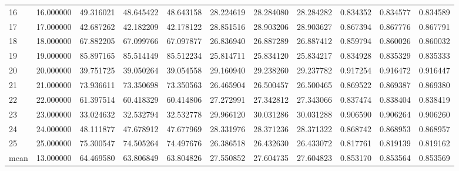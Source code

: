 \begin{tabular}{lrrrrrrrrrr}
16 & 16.000000 & 49.316021 & 48.645422 & 48.643158 & 28.224619 & 28.284080 & 28.284282 & 0.834352 & 0.834577 & 0.834589 \\
17 & 17.000000 & 42.687262 & 42.182209 & 42.178122 & 28.851516 & 28.903206 & 28.903627 & 0.867394 & 0.867776 & 0.867791 \\
18 & 18.000000 & 67.882205 & 67.099766 & 67.097877 & 26.836940 & 26.887289 & 26.887412 & 0.859794 & 0.860026 & 0.860032 \\
19 & 19.000000 & 85.897165 & 85.514149 & 85.512234 & 25.814711 & 25.834120 & 25.834217 & 0.834928 & 0.835329 & 0.835333 \\
20 & 20.000000 & 39.751725 & 39.050264 & 39.054558 & 29.160940 & 29.238260 & 29.237782 & 0.917254 & 0.916472 & 0.916447 \\
21 & 21.000000 & 73.936611 & 73.350698 & 73.350563 & 26.465904 & 26.500457 & 26.500465 & 0.869522 & 0.869387 & 0.869380 \\
22 & 22.000000 & 61.397514 & 60.418329 & 60.414806 & 27.272991 & 27.342812 & 27.343066 & 0.837474 & 0.838404 & 0.838419 \\
23 & 23.000000 & 33.024632 & 32.532794 & 32.532778 & 29.966120 & 30.031286 & 30.031288 & 0.906590 & 0.906264 & 0.906260 \\
24 & 24.000000 & 48.111877 & 47.678912 & 47.677969 & 28.331976 & 28.371236 & 28.371322 & 0.868742 & 0.868953 & 0.868957 \\
25 & 25.000000 & 75.300547 & 74.505264 & 74.497676 & 26.386518 & 26.432630 & 26.433072 & 0.817761 & 0.819139 & 0.819162 \\
mean & 13.000000 & 64.469580 & 63.806849 & 63.804826 & 27.550852 & 27.604735 & 27.604823 & 0.853170 & 0.853564 & 0.853569 \\
\end{tabular}

